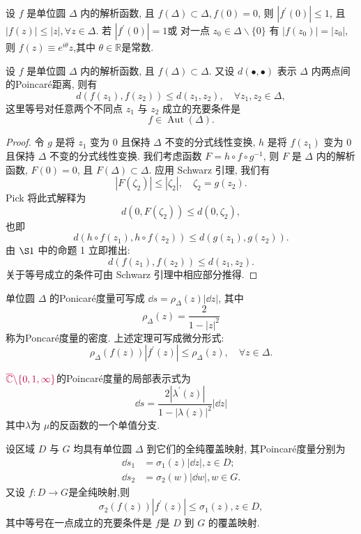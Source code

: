 \begin{thm}[Schwarz 引理] \label{thm: Schwarz lem}
    设 $f$ 是单位圆 $\Delta$ 内的解析函数, 且 $f(\Delta)\subset \Delta, f(0)=0$, 则 $|f^\prime (0)|\leqslant 1$, 且 $|f(z)|\leqslant |z|,\forall z\in \Delta$. 若 $|f^\prime (0)|=1$或 对一点 $z_0\in \Delta\backslash \{0\}$ 有 $|f(z_0)|=|z_0|$, 则 $f(z)\equiv e^{i\theta}z$,其中 $\theta\in \mathbb{R}$是常数.
\end{thm}
\begin{thm}\label{thm: Schwarz - pick thm}
    设 $f$ 是单位圆 $\Delta$ 内的解析函数, 且 $f(\Delta)\subset \Delta$. 又设 $d(\bullet,\bullet)$ 表示 $\Delta$ 内两点间的Poincar\'{e}距离, 则有
    \[d(f(z_1),f(z_2))\leqslant d(z_1,z_2),\quad\forall z_1,z_2\in \Delta,\]
    这里等号对任意两个不同点 $z_1$ 与 $z_2$ 成立的充要条件是
    \[f\in \operatorname{Aut} (\Delta).\]
\end{thm}
\begin{proof}
    令 $g$ 是将 $z_1$ 变为 0 且保持 $\Delta$ 不变的分式线性变换, $h$ 是将 $f\left(z_1\right)$ 变为 0 且保持 $\Delta$ 不变的分式线性变换. 我们考虑函数 $F=h \circ f \circ g^{-1}$, 则 $F$ 是 $\Delta$ 内的解析函数, $F(0)=0$, 且 $F(\Delta) \subset \Delta$. 应用 Schwarz 引理, 我们有
$$
\left|F\left(\zeta_2\right)\right| \leqslant\left|\zeta_2\right|, \quad \zeta_2=g\left(z_2\right) .
$$
Pick 将此式解释为
$$
d\left(0, F\left(\zeta_2\right)\right) \leqslant d\left(0, \zeta_2\right),
$$
也即
$$
d\left(h \circ f\left(z_1\right), h \circ f\left(z_2\right)\right) \leqslant d\left(g\left(z_1\right), g\left(z_2\right)\right) .
$$
由 $\S 1$ 中的命题 1 立即推出:
$$
d\left(f\left(z_1\right), f\left(z_2\right)\right) \leqslant d\left(z_1, z_2\right) .
$$
关于等号成立的条件可由 Schwarz 引理中相应部分推得.
\end{proof}
\begin{defi}[Poincar\'{e}度量]
    {\color{magenta} 单位圆 $\Delta$ }的Ponicar\'{e}度量可写成 $\dd s=\rho_\Delta (z) |\dd z|$, 其中
    \[\rho_\Delta (z)=\frac{2}{1-|z|^2}\]
    称为Poncar\'{e}度量的密度. 上述定理可写成微分形式:
    \[\rho_\Delta (f(z))|f^\prime (z)|\leqslant \rho_\Delta (z),\quad\forall z\in \Delta.\]

    $\color{purple}{\overline{\mathbb{C}}\backslash \{0,1,\infty\}}$的Poincar\'{e}度量的局部表示式为
    \[\dd s=\frac{2|\lambda^\prime(z)|}{1-|\lambda(z)|^2}|\dd z|
    \]
    其中$\lambda$为 $\mu$的反函数的一个单值分支.
\end{defi}
\begin{thm}[广义Schwarz引理]\label{thm: extension of Schwarz lem}
    设区域 $D$ 与 $G$ 均具有单位圆 $\Delta$ 到它们的全纯覆盖映射, 其Poincar\'{e}度量分别为
    \begin{align*}
        \dd s_1 &=\sigma_1 (z) |\dd z|,z\in D;\\ 
        \dd s_2 &=\sigma_2 (w) |\dd w|,w\in G.
    \end{align*}
    又设 $f\colon D\to G$是全纯映射,则
    \[\sigma_2 (f(z))|f^\prime (z)|\leqslant \sigma_1 (z),z\in D,\]
    其中等号在一点成立的充要条件是 $f$是 $D$ 到 $G$ 的覆盖映射.
\end{thm}
